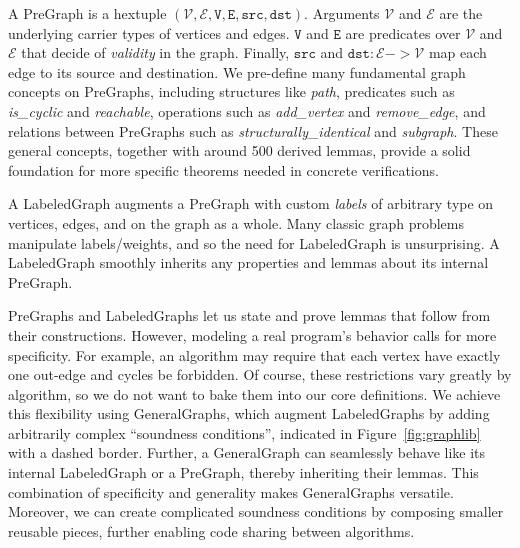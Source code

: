 \documentclass[sigplan, anonymous=false, review=false]{acmart}
\newcommand\hide[1]{}
\begin{document}
\hide{The most basic kind of graph is PreGraph,
out of which we build LabeledGraphs, and which in turn are used to
build GeneralGraphs. Each kind has some lemmas and also inherits the
lemmas of the previous kind. The dashed box represents a ``plugin''
system to attach custom properties.}

A PreGraph is a hextuple $(\mathcal{V}, \mathcal{E}, \mathtt{V}, \mathtt{E}, \mathtt{src}, \mathtt{dst})$.  Arguments $\mathcal{V}$ and $\mathcal{E}$ are the underlying
carrier types of vertices and edges.  $\mathtt{V}$ and $\mathtt{E}$ are predicates over
$\mathcal{V}$ and $\mathcal{E}$ that decide
of \emph{validity} in the graph.  
Finally, $\mathtt{src}$ and $\mathtt{dst}: \mathcal{E} -> \mathcal{V}$ map each edge to
its source and destination. 
We pre-define many fundamental graph concepts on PreGraphs,
including structures like \emph{path}, predicates
such as \emph{is\_cyclic} and \emph{reachable},
operations such as \emph{add\_vertex}
and \emph{remove\_edge}, and relations between PreGraphs such
as \emph{structurally\_identical} and \emph{subgraph}.
These general concepts, together with around 500 derived lemmas,
provide a solid foundation for more specific theorems needed in concrete
verifications.

A LabeledGraph augments a PreGraph with custom \emph{labels} 
of arbitrary type on vertices, edges, and on the graph as a whole. 
Many classic graph problems manipulate labels/weights, and so the need for 
LabeledGraph is unsurprising. A LabeledGraph smoothly inherits any properties 
and lemmas about its internal PreGraph.

PreGraphs and LabeledGraphs let us state
and prove lemmas that follow from their constructions. However, 
modeling a real program's behavior 
calls for more specificity.
For example, an algorithm may require that each vertex have exactly one out-edge
and cycles be forbidden.
Of course, these restrictions vary greatly by algorithm, so we do not
want to bake them into our core definitions.
We achieve this flexibility using GeneralGraphs, which augment
LabeledGraphs by adding arbitrarily complex ``soundness conditions'', indicated in
Figure~\ref{fig:graphlib} with a dashed border.
Further, a GeneralGraph can seamlessly behave like its internal
LabeledGraph or a PreGraph, thereby inheriting their lemmas.
This combination of specificity and generality
makes GeneralGraphs versatile. Moreover, we can
create complicated soundness conditions by composing smaller reusable pieces,
further enabling code sharing between algorithms.
\end{document}
